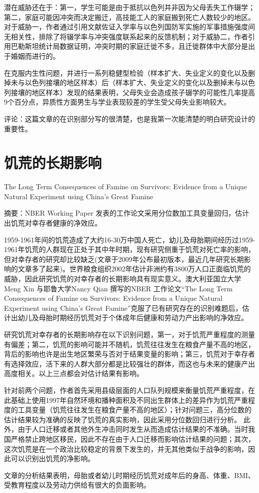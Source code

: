 \documentclass{book}
\begin{document}
\par 潜在威胁还在于：第一，学生可能是由于抵抗以色列并非因为父母丢失工作辍学；第二，家庭可能因冲突而决定搬迁，高技能工人的家庭搬到死亡人数较少的地区。对于威胁一，作者通过引用文献佐证入学率与以色列国防军实施的军事措施强度间无相关性，排除了将辍学率与冲突强度联系起来的反馈机制；对于威胁二，作者引用巴勒斯坦统计局数据证明，冲突时期的家庭迁徙不多，且迁徙群体中大部分是出于婚姻而进行的。
\par 在克服内生性问题，并进行一系列稳健型检验（样本扩大、失业定义的变化以及删掉未与以色列接壤的地区样本）后（样本扩大、失业定义的变化以及删掉未与以色列接壤的地区样本）发现的结果表明，父母失业会造成孩子辍学的可能性几率提高9个百分点，异质性方面男生与学业表现较差的学生受父母失业影响较大。
\par 评论：这篇文章的在识别部分写的很清楚，也是我第一次能清楚的明白研究设计的重要性。

\newpage
\section{饥荒的长期影响}
The Long Term Consequences of Famine on Survivors: Evidence from a Unique Natural Experiment using China's Great Famine
\par 摘要：NBER Working Paper 发表的工作论文采用分位数加工具变量回归，估计出饥荒对幸存者健康的净效应\citep{meng_long_2009}。
\par 1959-1961年间的饥荒造成了大约16-30万中国人死亡，幼儿及母胎期间经历过1959-1961年饥荒的人群现在正处于其中年时期，现有研究侧重于饥荒对死亡率的影响，但对幸存者的研究却比较缺乏(文章于2009年公布最初版本，最近几年研究长期影响的文章多了起来)。世界粮食组织2002年估计非洲约有3800万人口正面临饥荒的威胁，因此研究饥荒的对幸存者的长期影响具有现实意义。澳大利亚国立大学 Meng Xin 与耶鲁大学Nancy Qian 撰写的NBER 工作论文“The Long Term Consequences of Famine on Survivors: Evidence from a Unique Natural Experiment using China's Great Famine”克服了已有研究存在的识别难题后，估计出幼儿及母胎时期经历饥荒对于个体成年后健康和劳动力产出影响的净效应。
\par 研究饥荒对幸存者的长期影响存在以下识别问题，第一，对于饥荒严重程度的测量有偏差；第二，饥荒的影响可能并不随机，饥荒往往发生在粮食产量不高的地区，背后的影响也许是出生地区繁荣与否对于结果变量的影响；第三，饥荒对于幸存者有选择效应，活下来的人群大部分都是比较强壮的群体，而这也与未来的健康产出高度相关。以上三点都会对估计结果有影响。
\par 针对前两个问题，作者首先采用县级层面的人口队列规模来衡量饥荒严重程度，在此基础上使用1997年自然环境和播种面积及不同出生群体上的差异作为饥荒严重程度的工具变量（饥荒往往发生在粮食产量不高的地区）；针对问题三，高分位数的估计结果较为准确的反映了饥荒的真实影响，因此采用分位数回归进行分析。
此外，由于人口迁移或者其他外生冲击同时发生从而造成估计结果的不准确。当时我国严格禁止跨地区移民，因此不存在由于人口迁移而影响估计结果的问题；其次，这次饥荒是在一个政治比较稳定的背景下发生的，并无其他类似于战争的影响，因此可以识别出饥荒的净影响。
\par 文章的分析结果表明，母胎或者幼儿时期经历饥荒对成年后的身高、体重、BMI、受教育程度以及劳动力供给有很大的负面影响。
\end{document}
